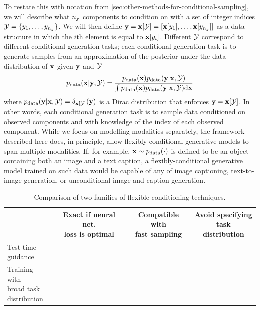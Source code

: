 To restate this with notation from \cref{sec:other-methods-for-conditional-sampling}, we will describe what $n_{\mathbf{y}}$ components to condition on with a set of integer indices ${\mathcal{Y}} = \{ y_1, \ldots, y_{n_{\mathbf{y}}} \}$. We will then define ${\mathbf{y}} = {\mathbf{x}}[{\mathcal{Y}}] = [ {\mathbf{x}}[y_1], \ldots, {\mathbf{x}}[y_{n_{\mathbf{y}}}] ]$ as a data structure in which the $i$th element is equal to ${\mathbf{x}}[y_i]$. Different ${\mathcal{Y}}$ correspond to different conditional generation tasks; each conditional generation task is to generate samples from an approximation of the posterior under the data distribution of ${\mathbf{x}}$ given ${\mathbf{y}}$ and ${\mathcal{Y}}$
\begin{equation} \label{eq:flexible-diffusion-target}
    p_{\rm{data}}({\mathbf{x}} | {\mathbf{y}}, {\mathcal{Y}}) = \frac{p_{\rm{data}}({\mathbf{x}})p_{\rm{data}}({\mathbf{y}}|{\mathbf{x}},{\mathcal{Y}})}{\int p_{\rm{data}}({\mathbf{x}})p_{\rm{data}}({\mathbf{y}}|{\mathbf{x}},{\mathcal{Y}}) \mathrm{d}{\mathbf{x}}} 
\end{equation}
where $p_{\rm{data}}({\mathbf{y}}|{\mathbf{x}},{\mathcal{Y}}) = \delta_{{\mathbf{x}}[{\mathcal{Y}}]}({\mathbf{y}})$ is a Dirac distribution that enforces ${\mathbf{y}} = {\mathbf{x}}[{\mathcal{Y}}]$.
In other words, each conditional generation task is to sample data conditioned on observed components and with knowledge of the index of each observed component. 
%
While we focus on modelling modalities separately, the framework described here does, in principle, allow flexibly-conditional generative models to span multiple modalities. If, for example, ${\mathbf{x}} \sim p_{\rm{data}}(\cdot)$ is defined to be an object containing both an image and a text caption, a flexibly-conditional generative model trained on such data would be capable of any of image captioning, text-to-image generation, or unconditional image and caption generation.


\begin{table}[t]
    \centering
    \caption{Comparison of two families of flexible conditioning techniques.}
    \begin{tabular}{l|c|c|c}
        \toprule
        & \shortstack[c]{Exact if neural net. \\ loss is optimal}              & \shortstack[c]{Compatible with \\ fast sampling}      & \shortstack[c]{Avoid specifying \\ task distribution}  \\
        \midrule
        \shortstack[l]{Test-time \\ guidance}                               & \raisebox{0.5ex}{\xmark}     & \raisebox{0.5ex}{\xmark}     & \raisebox{0.5ex}{\checkmark} \\
        \midrule
        \shortstack[l]{Training with \\ broad task \\ distribution}         & \raisebox{2ex}{\checkmark} & \raisebox{2ex}{\checkmark} & \raisebox{2ex}{\xmark}     \\
        \bottomrule
    \end{tabular}
    \label{tab:comparison-flexible-conditioning}
\end{table}

